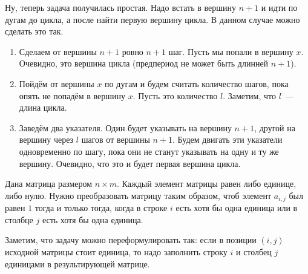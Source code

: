 \documentclass[addpoints]{exam}
\begin{document}
\begin{questions}
\begin{solution}
Ну, теперь задача получилась простая. Надо встать в вершину $n+1$ и идти по дугам до цикла, а после найти первую вершину цикла. В данном случае можно сделать это так.

\begin{enumerate}

\item Сделаем от вершины $n+1$ ровно $n+1$ шаг. Пусть мы попали в вершину $x$. Очевидно, это вершина цикла (предпериод не может быть длинней $n+1$).

\item Пойдём от вершины $x$ по дугам и будем считать количество шагов, пока опять не попадём в вершину $x$. Пусть это количество $l$. Заметим, что $l$~--- длина цикла. 

\item Заведём два указателя. Один будет указывать на вершину $n+1$, другой на вершину через $l$ шагов от вершины $n+1$. Будем двигать эти указатели одновременно по шагу, пока они не станут указывать на одну и ту же вершину. Очевидно, что это и будет первая вершина цикла.

\end{enumerate}

\end{solution}


\question Дана матрица размером $n \times m$. Каждый элемент матрицы равен либо единице, либо нулю. Нужно преобразовать матрицу таким образом, чтоб элемент $a_{i,j}$ был равен $1$ тогда и только тогда, когда в строке $i$ есть хотя бы одна единица или в столбце $j$ есть хотя бы одна единица. 


\begin{solution}

Заметим, что задачу можно переформулировать так: если в позиции $(i,j)$ исходной матрицы стоит единица, то надо заполнить строку $i$ и столбец $j$ единицами в результирующей матрице.


\end{solution}
\end{questions}
\end{document}
